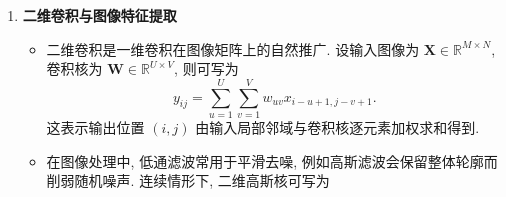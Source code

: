 \documentclass{../nndlcourse}
\begin{document}
\begin{enumerate}
    \begin{itemize}
        \item 卷积核也可以看作滤波器. 若卷积核更强调邻域平均, 它倾向于保留缓慢变化的低频成分, 这就是低通滤波. 例如
        \begin{equation*}
            \boldsymbol{w}_{\mathrm{lp}} = \frac{1}{3}[1,1,1]
        \end{equation*}
        会把相邻时刻做局部平均, 从而使信号变得更平滑.
        \item 与之相对, 高通滤波更强调快速变化的部分, 常用于突出边缘、尖峰或局部突变. 因此高通滤波不是“磨光”, 而是更偏向放大高频变化. 例如
        \begin{equation*}
            \boldsymbol{w}_{\mathrm{hp}} = [1,-2,1]
        \end{equation*}
        对应二阶差分, 能显著响应曲率变化较大的位置.
        \item 卷积还可近似导数运算. 例如中央差分常写为
        \begin{equation*}
            x'(t) \approx \frac{x_{t+1} - x_{t-1}}{2},
        \end{equation*}
        对应的卷积核可写为 $\frac{1}{2}[-1,0,1]$ 或符号相反的 $\frac{1}{2}[1,0,-1]$. 这里的符号差异通常来自卷积与互相关的定义方向不同, 但它们都在刻画一阶变化率.
        \item 类似地,
        \begin{equation*}
            x''(t) \approx x_{t+1} - 2x_t + x_{t-1}
        \end{equation*}
        对应二阶差分核 $[1,-2,1]$. 这说明卷积并不只是“求加权和”, 它还能够把局部趋势、斜率和曲率等结构信息编码出来.
    \end{itemize}
    \item \textbf{二维卷积与图像特征提取}
    \begin{itemize}
        \item 二维卷积是一维卷积在图像矩阵上的自然推广. 设输入图像为 $\boldsymbol{X} \in \mathbb{R}^{M \times N}$, 卷积核为 $\boldsymbol{W} \in \mathbb{R}^{U \times V}$, 则可写为
        \begin{equation*}
            y_{ij} = \sum_{u=1}^{U} \sum_{v=1}^{V} w_{uv} x_{i-u+1, j-v+1}.
        \end{equation*}
        这表示输出位置 $(i,j)$ 由输入局部邻域与卷积核逐元素加权求和得到.
        \item 在图像处理中, 低通滤波常用于平滑去噪, 例如高斯滤波会保留整体轮廓而削弱随机噪声. 连续情形下, 二维高斯核可写为
        \begin{equation*}

\end{equation*}
\end{itemize}
\end{enumerate}
\end{document}
